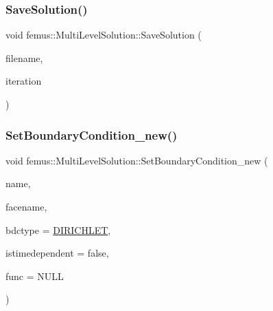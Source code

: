 \mbox{\label{classfemus_1_1_multi_level_solution_a3844d272681081d0f75a5203cd09a1bc}} 
\subsubsection{\texorpdfstring{Save\+Solution()}{SaveSolution()}\hspace{0.1cm}{\footnotesize\ttfamily [2/2]}}
{\footnotesize\ttfamily void femus\+::\+Multi\+Level\+Solution\+::\+Save\+Solution (\begin{DoxyParamCaption}\item[{const char $\ast$}]{filename,  }\item[{const unsigned \&}]{iteration }\end{DoxyParamCaption})}

\mbox{\label{classfemus_1_1_multi_level_solution_a8222acd002287bc27090141ef6e7ef1f}} 
\subsubsection{\texorpdfstring{Set\+Boundary\+Condition\+\_\+new()}{SetBoundaryCondition\_new()}}
{\footnotesize\ttfamily void femus\+::\+Multi\+Level\+Solution\+::\+Set\+Boundary\+Condition\+\_\+new (\begin{DoxyParamCaption}\item[{const std\+::string}]{name,  }\item[{const std\+::string}]{facename,  }\item[{const \mbox{\hyperlink{_b_d_c_type_enum_8hpp_ac1efcf28f6f152fe5354b888f616668d}{B\+D\+C\+Type}}}]{bdctype = {\ttfamily \mbox{\hyperlink{_b_d_c_type_enum_8hpp_ac1efcf28f6f152fe5354b888f616668da1c2adefa6a3b7015b29913c49ee050c7}{D\+I\+R\+I\+C\+H\+L\+ET}}},  }\item[{const bool}]{istimedependent = {\ttfamily false},  }\item[{\mbox{\hyperlink{classfemus_1_1_function_base}{Function\+Base}} $\ast$}]{func = {\ttfamily NULL} }\end{DoxyParamCaption})}

